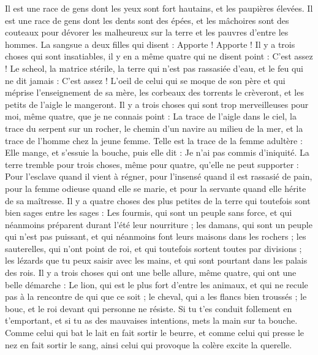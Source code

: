 \begin{multicols}{2}
Il est une race de gens dont les yeux sont fort hautains, et les paupières élevées.
Il est une race de gens dont les dents sont des épées, et les mâchoires sont des couteaux pour dévorer les malheureux sur la terre et les pauvres d’entre les hommes.
La sangsue a deux filles qui disent : Apporte ! Apporte ! Il y a trois choses qui sont insatiables, il y en a même quatre qui ne disent point : C'est assez !
Le scheol, la matrice stérile, la terre qui n'est pas rassasiée d'eau, et le feu qui ne dit jamais : C'est assez !
L'oeil de celui qui se moque de son père et qui méprise l'enseignement de sa mère, les corbeaux des torrents le crèveront, et les petits de l'aigle le mangeront.
Il y a trois choses qui sont trop merveilleuses pour moi, même quatre, que je ne connais point :
La trace de l'aigle dans le ciel, la trace du serpent sur un rocher, le chemin d'un navire au milieu de la mer, et la trace de l'homme chez la jeune femme.
Telle est la trace de la femme adultère : Elle mange, et s'essuie la bouche, puis elle dit : Je n'ai pas commis d'iniquité.
La terre tremble pour trois choses, même pour quatre, qu’elle ne peut supporter :
Pour l’esclave quand il vient à régner, pour l'insensé quand il est rassasié de pain,
pour la femme odieuse quand elle se marie, et pour la servante quand elle hérite de sa maîtresse.
Il y a quatre choses des plus petites de la terre qui toutefois sont bien sages entre les sages :
Les fourmis, qui sont un peuple sans force, et qui néanmoins préparent durant l'été leur nourriture ;
les damans, qui sont un peuple qui n’est pas puissant, et qui néanmoins font leurs maisons dans les rochers ;
les sauterelles, qui n'ont point de roi, et qui toutefois sortent toutes par divisions ;
les lézards que tu peux saisir avec les mains, et qui sont pourtant dans les palais des rois.
Il y a trois choses qui ont une belle allure, même quatre, qui ont une belle démarche :
Le lion, qui est le plus fort d'entre les animaux, et qui ne recule pas à la rencontre de qui que ce soit ;
le cheval, qui a les flancs bien troussés ; le bouc, et le roi devant qui personne ne résiste.
Si tu t’es conduit follement en t’emportant, et si tu as des mauvaises intentions, mets la main sur ta bouche.
Comme celui qui bat le lait en fait sortir le beurre, et comme celui qui presse le nez en fait sortir le sang, ainsi celui qui provoque la colère excite la querelle.

\end{multicols}
